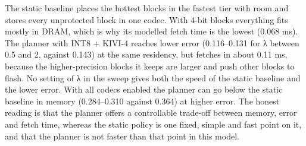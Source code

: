 \documentclass[12pt,a4paper]{report}
\begin{document}
The static baseline places the hottest blocks in the fastest tier with room and stores every unprotected block in one codec. With 4-bit blocks everything fits mostly in DRAM, which is why its modelled fetch time is the lowest (0.068 ms). The planner with INT8 + KIVI-4 reaches lower error (0.116–0.131 for λ between 0.5 and 2, against 0.143) at the same residency, but fetches in about 0.11 ms, because the higher-precision blocks it keeps are larger and push other blocks to flash. No setting of λ in the sweep gives both the speed of the static baseline and the lower error. With all codecs enabled the planner can go below the static baseline in memory (0.284–0.310 against 0.364) at higher error. The honest reading is that the planner offers a controllable trade-off between memory, error and fetch time, whereas the static policy is one fixed, simple and fast point on it, and that the planner is not faster than that point in this model.
\end{document}
